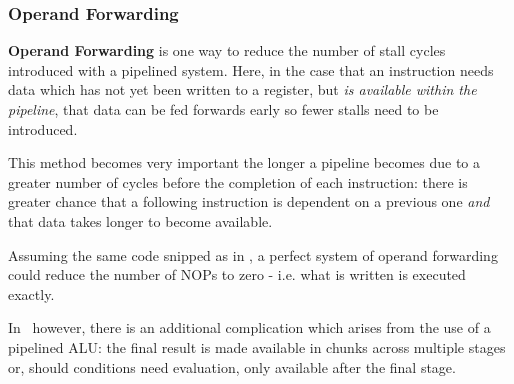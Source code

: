 \documentclass[a4paper, 11pt]{article}
\begin{document}
            \subsubsection{Operand Forwarding}\label{sec:Intro:OpFwd}

                \textbf{Operand Forwarding} is one way to reduce the number of 
                stall cycles introduced with a pipelined system. 
                Here, in the case that an instruction needs data which has not 
                yet been written to a register, but \emph{is available within 
                the pipeline}, that data can be fed forwards early so fewer 
                stalls need to be introduced.

                This method becomes very important the longer a pipeline becomes 
                due to a greater number of cycles before the completion of each
                instruction: there is greater chance that a following instruction
                is dependent on a previous one \emph{and} that data takes longer
                to become available.

                Assuming the same code snipped as in
                , a perfect system of
                operand forwarding could reduce the number of NOPs to zero
                - i.e. what is written is executed exactly.

                In \longlogo\ however, there is an additional complication which 
                arises from the use of a pipelined ALU: the final result is made 
                available in chunks across multiple stages or, should conditions 
                need evaluation, only available after the final stage.
\end{document}
